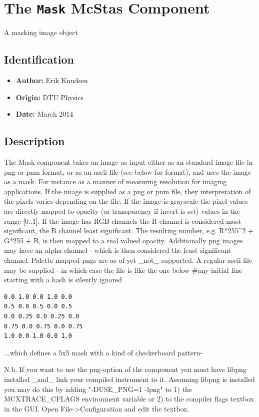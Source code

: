 \section{The \texttt{Mask} McStas Component}
A masking image object

\subsection*{Identification}
\begin{itemize}
  \item \textbf{Author:} Erik Knudsen
  \item \textbf{Origin:} DTU Physics
  \item \textbf{Date:} March 2014
\end{itemize}

\subsection*{Description}
The Mask component takes an image as input either as an standard image file in png or pnm format, or as an ascii file (see below for format), and uses the image as a mask. For instance as a manner of measuring resolution for imaging applications. If the image is supplied as a png or pnm file, they interpretation of the pixels varies depending on the file. If the image is grayscale the pixel values are directly mapped to opacity (or transparency if invert is set) values in the range [0..1]. If the image has RGB channels the R channel is considered most significant, the B channel least significant. The resulting number, e.g. R*255\textasciicircum{}2 + G*255 + B, is then mapped to a real valued opacity. Additionally png images may have an alpha channel - which is then considered the least significant channel. Palette mapped pngs are as of yet \_not\_ supported. A regular ascii file may be supplied - in which case the file is like the one below \#any initial line starting with a hash is silently ignored

\begin{verbatim}
0.0 1.0 0.0 1.0 0.0
0.5 0.0 0.5 0.0 0.5
0.0 0.25 0.0 0.25 0.0
0.75 0.0 0.75 0.0 0.75
1.0 0.0 1.0 0.0 1.0
\end{verbatim}

...which defines a 5x5 mask with a kind of checkerboard pattern-

N.b. If you want to use the png-option of the component you must have libpng installed \_and\_ link your compiled instrument to it. Assuming libpng is installed you may do this by adding "-DUSE\_PNG=1 -lpng" to 1) the MCXTRACE\_CFLAGS environment variable or 2) to the compiler flags textbox in the GUI. Open File-\textgreater{}Configuration and edit the textbox.

